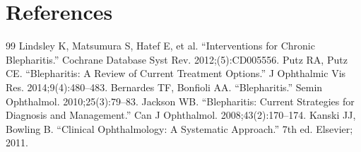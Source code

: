 \section*{References}
\begin{thebibliography}{99}
 Lindsley K, Matsumura S, Hatef E, et al. ``Interventions for Chronic Blepharitis.'' Cochrane Database Syst Rev. 2012;(5):CD005556.
 Putz RA, Putz CE. ``Blepharitis: A Review of Current Treatment Options.'' J Ophthalmic Vis Res. 2014;9(4):480--483.
 Bernardes TF, Bonfioli AA. ``Blepharitis.'' Semin Ophthalmol. 2010;25(3):79--83.
 Jackson WB. ``Blepharitis: Current Strategies for Diagnosis and Management.'' Can J Ophthalmol. 2008;43(2):170--174.
 Kanski JJ, Bowling B. ``Clinical Ophthalmology: A Systematic Approach.'' 7th ed. Elsevier; 2011.
\end{thebibliography}
